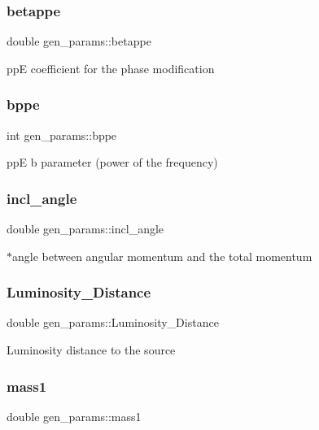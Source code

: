 \subsubsection{\texorpdfstring{betappe}{betappe}}
{\footnotesize\ttfamily double gen\+\_\+params\+::betappe}

ppE coefficient for the phase modification \mbox{\label{structgen__params_a2fd02506bbb8f372459a65622e6854e3}} 
\subsubsection{\texorpdfstring{bppe}{bppe}}
{\footnotesize\ttfamily int gen\+\_\+params\+::bppe}

ppE b parameter (power of the frequency) \mbox{\label{structgen__params_af07822f3c7c6f9c3abb38a7337ddf9a9}} 
\subsubsection{\texorpdfstring{incl\+\_\+angle}{incl\_angle}}
{\footnotesize\ttfamily double gen\+\_\+params\+::incl\+\_\+angle}

$\ast$angle between angular momentum and the total momentum \mbox{\label{structgen__params_a3acda7fc5d000217e487c364a08438b1}} 
\subsubsection{\texorpdfstring{Luminosity\+\_\+\+Distance}{Luminosity\_Distance}}
{\footnotesize\ttfamily double gen\+\_\+params\+::\+Luminosity\+\_\+\+Distance}

Luminosity distance to the source \mbox{\label{structgen__params_a61f517dacef76e1b86cc9025f4174e1d}} 
\subsubsection{\texorpdfstring{mass1}{mass1}}
{\footnotesize\ttfamily double gen\+\_\+params\+::mass1}

